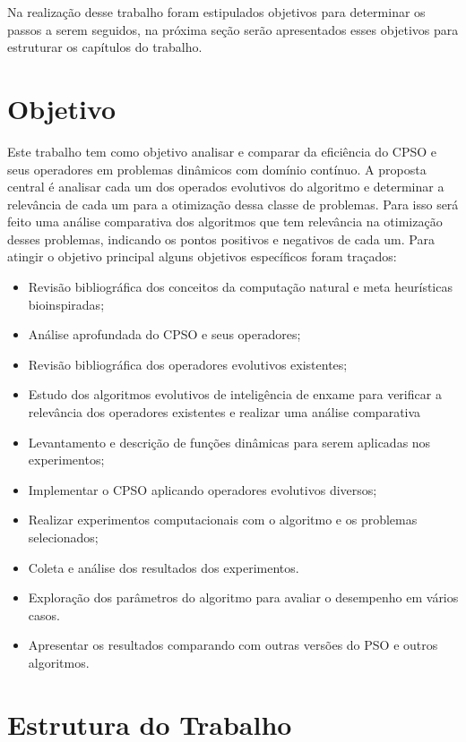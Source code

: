 Na realização desse trabalho foram estipulados objetivos para determinar os passos a serem seguidos, na próxima seção serão apresentados esses objetivos para estruturar os capítulos do trabalho.

\section{Objetivo}
\label{sec:objetivo}
Este trabalho tem como objetivo analisar e comparar da eficiência do CPSO e seus operadores em problemas dinâmicos com domínio contínuo. A proposta central é analisar cada um dos operados evolutivos do algoritmo e determinar a relevância de cada um para a otimização dessa classe de problemas. Para isso será feito uma análise comparativa dos algoritmos que tem relevância na otimização desses problemas, indicando os pontos positivos e negativos de cada um. Para atingir o objetivo principal alguns objetivos específicos foram traçados:

\begin{itemize}
\item Revisão bibliográfica dos conceitos da computação natural e meta heurísticas bioinspiradas;
\item Análise aprofundada do CPSO e seus operadores;
\item Revisão bibliográfica dos operadores evolutivos existentes;
\item Estudo dos algoritmos evolutivos de inteligência de enxame para verificar a relevância dos operadores existentes e realizar uma análise comparativa
\item Levantamento e descrição de funções dinâmicas para serem aplicadas nos experimentos;
\item Implementar o CPSO aplicando operadores evolutivos diversos;
\item Realizar experimentos computacionais com o algoritmo e os problemas selecionados;
\item Coleta e análise dos resultados dos experimentos.
\item Exploração dos parâmetros do algoritmo para avaliar o desempenho em vários casos.
\item Apresentar os resultados comparando com outras versões do PSO e outros algoritmos.
\end{itemize}

\section{Estrutura do Trabalho}
\label{sec:escopo}

